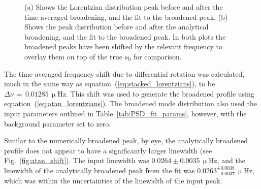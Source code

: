 \begin{figure}[ht!]
	\centering
	\qquad
	\caption{(a) Shows the Lorentzian distribution peak before and after the time-averaged broadening, and the fit to the broadened peak. (b) Shows the peak distribution before and after the analytical broadening, and the fit to the broadened peak. In both plots the broadened peaks have been shifted by the relevant frequency to overlay them on top of the true $\nu_0$ for comparison.} \label{fig:shifted_peaks}
\end{figure}


The time-averaged frequency shift due to differential rotation was calculated, much in the same way as equation~(\ref{eq:stacked_lorentzians}), to be $\Delta\nu \, = \,0.01285 \, \upmu\mathrm{Hz}$. This shift was used to generate the broadened profile using equation~(\ref{eq:atan_lorentzians}). The broadened mode distribution also used the input parameters outlined in Table~\ref{tab:PSD_fit_params}, however, with the background parameter set to zero.

Similar to the numerically broadened peak, by eye, the analytically broadened profile does not appear to have a significantly larger linewidth (see Fig.~\ref{fig:atan_shift}). The input linewidth was $0.0264 \pm 0.0035 \, \upmu\mathrm{Hz} $, and the linewidth of the analytically broadened peak from the fit was $0.0263^{+0.0038}_{-0.0037} \, \upmu\mathrm{Hz} $, which was within the uncertainties of the linewidth of the input peak.

